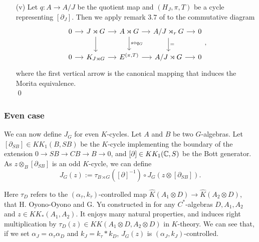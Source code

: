 \begin{dem}
\begin{enumerate}
\item[(v)] Let $q:A\rightarrow A/J$ be the quotient map and $(H_J, \pi, T)$ be a cycle representing $[\partial_J]$. Then we apply remark $3.7$ of \cite{OY2} to the commutative diagram
\[\begin{tikzcd}[column sep = small]
0\arrow{r} & J\rtimes G\arrow{r}\arrow{d} & A\rtimes G \arrow{r}\arrow{d}{s\circ q_G}& A/J\rtimes_r G\arrow{r}\arrow{d}{=} & 0\\
0\arrow{r} & K_{J\rtimes G}\arrow{r} & E^{(\pi,T)} \arrow{r}& A/J\rtimes G\arrow{r} & 0
\end{tikzcd},\]
where the first vertical arrow is the canonical mapping that induces the Morita equivalence. \\
\qed
\end{enumerate}
\end{dem}

\subsubsection{Even case}

We can now define $J_G$ for even $K$-cycles. Let $A$ and $B$ be two $G$-algebras. Let $[\partial_{SB}]\in KK_1(B,SB)$ be the $K$-cycle implementing the boundary of the extension $0\rightarrow SB\rightarrow CB\rightarrow B\rightarrow 0$, and $[\partial]\in KK_1(\mathbb C,S)$ be the Bott generator. As $z\otimes_B [\partial_{SB}]$ is an odd $K$-cycle, we can define
\[J_G(z):= \tau_{B\rtimes G}([\partial]^{-1})\circ J_G(z\otimes[\partial_{SB}]).\] 

Here $\tau_D$ refers to the $(\alpha_\tau,k_\tau)$-controlled map $\hat K (A_1\otimes D )\rightarrow \hat K(A_2\otimes D)$, that H. Oyono-Oyono and G. Yu constructed in \cite{OY2} for any $C^*$-algebras $D,A_1,A_2$ and $z\in KK_*(A_1,A_2)$. It enjoys many natural properties, and induces right multiplication by $\tau_D(z)\in KK(A_1\otimes D,A_2\otimes D)$ in $K$-theory. We can see that, if we set $\alpha_J=\alpha_\tau \alpha_D$ and $k_J=k_\tau * k_D$, $J_G(z)$ is $(\alpha_J,k_J)$-controlled.\\

